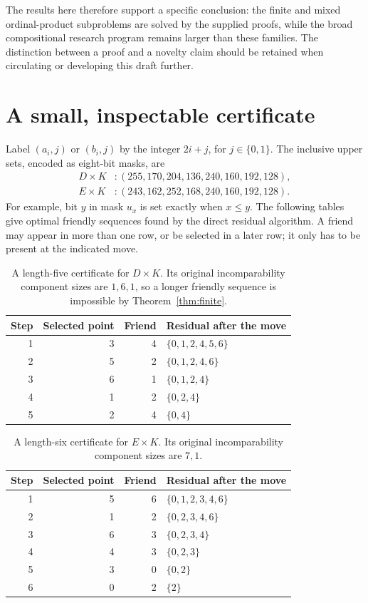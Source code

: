 \documentclass[11pt,letterpaper]{article}
\theoremstyle{definition}
\theoremstyle{remark}
\begin{document}
The results here therefore support a specific conclusion: the finite and
mixed ordinal-product subproblems are solved by the supplied proofs,
while the broad compositional research program remains larger than these
families. The distinction between a proof and a novelty claim should be
retained when circulating or developing this draft further.

\clearpage
\appendix
\section{A small, inspectable certificate}\label{app:certificate}

Label $(a_i,j)$ or $(b_i,j)$ by the integer $2i+j$, for $j\in\{0,1\}$.
The inclusive upper sets, encoded as eight-bit masks, are
\[
\begin{aligned}
 D\times K &: (255,170,204,136,240,160,192,128),\\
 E\times K &: (243,162,252,168,240,160,192,128).
\end{aligned}
\]
For example, bit $y$ in mask $u_x$ is set exactly when $x\le y$.
The following tables give optimal friendly sequences found by the direct
residual algorithm. A friend may appear in more than one row, or be
selected in a later row; it only has to be present at the indicated move.

\begin{table}[ht]
\centering
\begin{tabular}{@{}rrrl@{}}
\toprule
Step & Selected point & Friend & Residual after the move\\
\midrule
1 & 3 & 4 & $\{0,1,2,4,5,6\}$\\
2 & 5 & 2 & $\{0,1,2,4,6\}$\\
3 & 6 & 1 & $\{0,1,2,4\}$\\
4 & 1 & 2 & $\{0,2,4\}$\\
5 & 2 & 4 & $\{0,4\}$\\
\bottomrule
\end{tabular}
\caption{A length-five certificate for $D\times K$. Its original
incomparability component sizes are $1,6,1$, so a longer friendly sequence
is impossible by Theorem~\ref{thm:finite}.}
\end{table}

\begin{table}[ht]
\centering
\begin{tabular}{@{}rrrl@{}}
\toprule
Step & Selected point & Friend & Residual after the move\\
\midrule
1 & 5 & 6 & $\{0,1,2,3,4,6\}$\\
2 & 1 & 2 & $\{0,2,3,4,6\}$\\
3 & 6 & 3 & $\{0,2,3,4\}$\\
4 & 4 & 3 & $\{0,2,3\}$\\
5 & 3 & 0 & $\{0,2\}$\\
6 & 0 & 2 & $\{2\}$\\
\bottomrule
\end{tabular}
\caption{A length-six certificate for $E\times K$. Its original
incomparability component sizes are $7,1$.}
\end{table}
\end{document}
